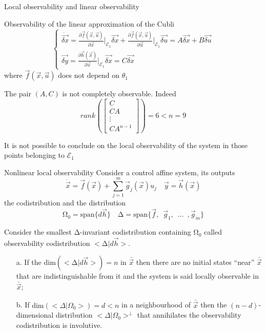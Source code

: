 \begin{frame}[shrink = 10]{Local observability and linear observability \cubli}
  \begin{exampleblock}{Observability of the linear approximation of the Cubli}
    \[
    \begin{cases}
      \dot{\vec{\delta x}} = \frac{\partial{\vec{f}(\vec{x},\vec{u})}}{\partial{\vec{x}}}\Big|_{\mathcal{E}_1} \vec{\delta x} +
      \frac{\partial{\vec{f}(\vec{x},\vec{u})}}{\partial{\vec{u}}}\Big|_{\mathcal{E}_1} \vec{\delta u} = A \vec{\delta x} + B \vec{\delta u}\\
      \vec{\delta y} = \frac{\partial{\vec{h}(\vec{x})}}{\partial{\vec{x}}}\Big|_{\mathcal{E}_1} \vec{\delta x}= C \vec{\delta x}
    \end{cases}
    \]
    where $\vec{f}(\vec{x},\vec{u})$ does \alert{not} depend on $\theta_1$
    \par
    The pair $(A, C)$ is \alert{not} completely observable. Indeed
    \[
    rank\left(
    \begin{bmatrix}
      C \\ CA  \\ \vdots \\ CA^{n-1}
    \end{bmatrix}
    \right) = 6 < n = 9
    \]
  \end{exampleblock}
  It is \alert{not possible to conclude} on the local observability of the system
  in those points belonging to $\mathcal{E}_1$
\end{frame}

\begin{frame}[shrink = 10]{Nonlinear local observability \theory}
  \small
  Consider a control affine system, its outputs
  \[
    \dot{\vec{x}} = \vec{f}(\vec{x}) + \sum\limits_{j=1}^{m}\vec{g}_j(\vec{x}) u_{j} \quad \vec{y} = \vec{h}(\vec{x})
  \]
  the codistribution and the distribution
  \[
  \mathrm{\Omega}_0 = \mathrm{span} \{ d \vec{h}\} \quad \mathrm{\Delta}= \mathrm{span} \{\vec{f},\enspace\vec{g}_1, \enspace \hdots \enspace, \vec{g}_m\}
  \]
  \begin{theorem}
    Consider the smallest $\mathrm{\Delta}$-invariant codistribution containing $\mathrm{\Omega}_0$ called
    \alert{observability codistribution} $< \mathrm{\Delta} | d\vec{h} >$.
    \vskip-0.2in
    \begin{itemize}
    \item[a.]If the $\text{dim}(< \mathrm{\Delta}|d\vec{h} >) = n$ in $\bar{\vec{x}}$ then
      there are no initial states ``near'' $\bar{\vec{x}}$ that are indistinguishable from
      it and the system is said locally observable in $\bar{\vec{x}}$;
    \item[b.]If $\text{dim}(< \Delta|\Omega_0 >) = d < n$ in a neighbourhood of $\bar{\vec{x}}$ then
      the $(n-d)$-dimensional distribution $< \Delta|\Omega_0 >^{\perp}$ that annihilates
      the observability codistribution is involutive.
    \end{itemize}
  \end{theorem}
\end{frame}

